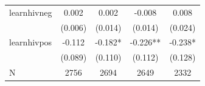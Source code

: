\begin{tabular}{lcccc}
\hline
learnhivneg & 0.002 & 0.002 & -0.008 & 0.008 \\
 & (0.006) & (0.014) & (0.014) & (0.024) \\
learnhivpos & -0.112 & -0.182* & -0.226** & -0.238* \\
 & (0.089) & (0.110) & (0.112) & (0.128) \\
\hline
N & 2756 & 2694 & 2649 & 2332 \\
\hline
\end{tabular}
